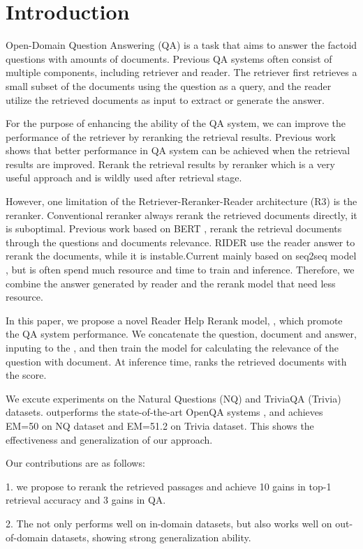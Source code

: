 \section{Introduction}

Open-Domain Question Answering (QA) is a task that aims to answer the factoid questions with amounts of documents. Previous QA systems \cite{chen2017reading} often consist of multiple components, including retriever and reader. The retriever first retrieves a small subset of the documents using the question as a query, and the reader utilize the retrieved documents as input to extract or generate the answer. 

For the purpose of enhancing the ability of the QA system, we can improve the performance of the retriever by reranking the retrieval results. Previous work \cite{karpukhin2020dense} shows that better performance in QA system can be achieved when the retrieval results are improved. Rerank the retrieval results by reranker which is a very useful approach and is wildly used after retrieval stage.

However, one limitation of the Retriever-Reranker-Reader architecture (R3) is the reranker. Conventional reranker always rerank the retrieved documents directly, it is suboptimal. Previous work  based on BERT \cite{nogueira2019passage, gao2021rethink}, rerank the retrieval documents through the questions and documents relevance. RIDER \cite{mao2021rider}  use the reader answer to rerank the documents, while it is instable.Current mainly based on seq2seq model \cite{sachan2022improving}, but is often spend much resource and time to train and inference. Therefore, we combine the answer generated by reader and the rerank model that need less resource.


In this paper, we propose a novel Reader Help Rerank model, \system{}, which promote the QA system performance. We concatenate the question, document and answer, inputing to the \system{}, and then train the model for calculating the relevance of the question with document. At inference time, \system{} ranks the retrieved documents with the score.

We excute experiments on the Natural Questions (NQ) \cite{kwiatkowski2019natural} and TriviaQA (Trivia) \cite{joshi2017triviaqa} datasets. \system{} outperforms the state-of-the-art OpenQA systems \citep{karpukhin2020dense,sachan2021end}, and achieves EM=50 on NQ dataset and EM=51.2 on Trivia dataset. This shows the effectiveness and generalization of our approach.

Our contributions are as follows:

1. we propose \system{} to rerank the retrieved passages and achieve 10 gains in top-1 retrieval accuracy and 3 gains in QA.

2. The \system{} not only performs well on in-domain datasets, but also works well on out-of-domain datasets, showing strong generalization ability.
